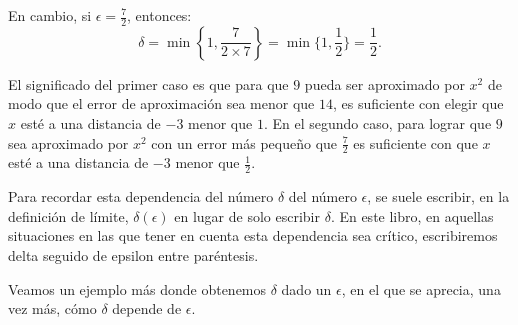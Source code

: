 En cambio, si $\epsilon = \frac{7}{2}$, entonces:
\[
\delta = \min\left\{1,\frac{7}{2\times 7}\right\} = \min\{1,\frac{1}{2}\} = \frac{1}{2}.
\]

El significado del primer caso es que para que $9$ pueda ser aproximado por $x^2$ de modo que el
error de aproximación sea menor que $14$, es suficiente con elegir que $x$ esté a una distancia de
$-3$ menor que $1$. En el segundo caso, para lograr que $9$ sea aproximado por $x^2$ con un error
más pequeño que $\frac{7}{2}$ es suficiente con que $x$ esté a una distancia de $-3$ menor que
$\frac{1}{2}$.

Para recordar esta dependencia del número $\delta$ del número $\epsilon$, se suele escribir, en la
definición de límite, $\delta(\epsilon)$ en lugar de solo escribir $\delta$. En este libro, en
aquellas situaciones en las que tener en cuenta esta dependencia sea crítico, escribiremos delta
seguido de epsilon entre paréntesis.

Veamos un ejemplo más donde obtenemos $\delta$ dado un $\epsilon$, en el que se aprecia, una vez
más, cómo $\delta$ depende de $\epsilon$.

